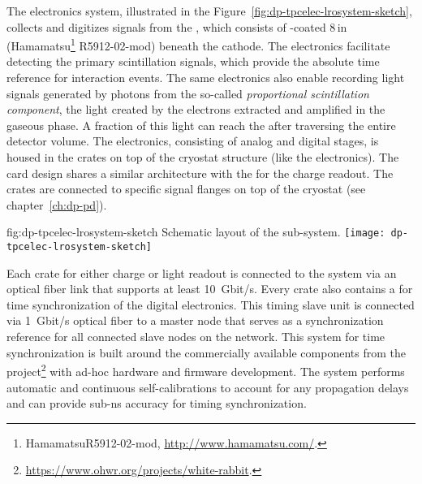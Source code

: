 The  electronics system, illustrated in the Figure~\ref{fig:dp-tpcelec-lrosystem-sketch},  collects and digitizes signals from the , which consists of -coated \num{8}\,in  (Hamamatsu\footnote{Hamamatsu\texttrademark R5912-02-mod, \url{http://www.hamamatsu.com/}.} R5912-02-mod) beneath the  cathode. The  electronics facilitate detecting the primary scintillation signals, which provide the absolute time reference for interaction events. The same electronics also enable recording light signals generated by photons from the so-called \textit{proportional scintillation component}, the light created by the electrons extracted and amplified in the gaseous phase. A fraction of this light can reach the  after traversing the entire detector volume. The  electronics, consisting of analog and digital stages, is housed in the  crates on top of the cryostat structure (like the  electronics). The   card design shares a similar architecture with the  for the charge readout. The   crates are connected to specific  signal \fdth flanges on top of the cryostat (see chapter~\ref{ch:dp-pd}).

\begin{dunefigure}{fig:dp-tpcelec-lrosystem-sketch}
{Schematic layout of the   sub-system.}
\texttt{[image: dp-tpcelec-lrosystem-sketch]}
\end{dunefigure}

Each  crate for either charge or light readout is connected to the  system via an optical fiber link that supports at least \SI{10}{Gbit/s}. Every crate also contains a  for time synchronization of the digital electronics. This timing slave unit is connected via \SI{1}{Gbit/s} optical fiber to a master node that serves as a synchronization reference for all connected slave nodes on the network. This system for time synchronization is built around the commercially available components from the  project\footnote{\url{https://www.ohwr.org/projects/white-rabbit}.} with ad-hoc hardware and firmware development. The system performs automatic and continuous self-calibrations to account for any propagation delays and can provide sub-\si{\nano\s} accuracy for timing synchronization.




